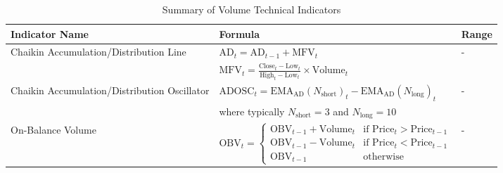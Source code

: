 \begin{table}[htb!]
\caption{Summary of Volume Technical Indicators}
\label{Table:VolumeIndicators}
\centering
\footnotesize
\begin{tabularx}{\textwidth}{@{}lXl@{}}
\toprule
\textbf{Indicator Name} & \textbf{Formula} & \textbf{Range} \\ 
\midrule
Chaikin Accumulation/Distribution Line & $\text{AD}_t = \text{AD}_{t-1} + \text{MFV}_t$ & - \\
\addlinespace
& $\text{MFV}_t = \frac{\text{Close}_t - \text{Low}_t}{\text{High}_t - \text{Low}_t} \times \text{Volume}_t$ & \\
\addlinespace
Chaikin Accumulation/Distribution Oscillator & $\text{ADOSC}_t = \text{EMA}_\text{AD}(N_{\text{short}})_t - \text{EMA}_\text{AD}(N_{\text{long}})_t$ & - \\
\addlinespace
& where typically $N_{\text{short}} = 3$ and $N_{\text{long}} = 10$ & \\
\addlinespace
On-Balance Volume & $\text{OBV}_t = 
\begin{cases} 
\text{OBV}_{t-1} + \text{Volume}_t & \text{if } \text{Price}_t > \text{Price}_{t-1} \\
\text{OBV}_{t-1} - \text{Volume}_t & \text{if } \text{Price}_t < \text{Price}_{t-1} \\
\text{OBV}_{t-1} & \text{otherwise}
\end{cases}$ & - \\
\bottomrule
\end{tabularx}
\end{table}
